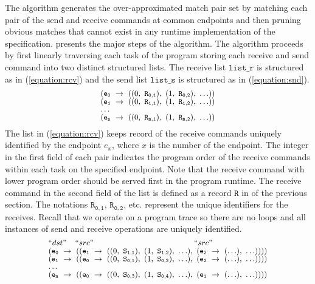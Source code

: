 The algorithm generates the over-approximated match pair set by matching each pair of the send and receive commands at common endpoints and then pruning obvious matches that cannot exist in any runtime implementation of the specification.  presents the major steps of the algorithm. The algorithm proceeds by first linearly traversing each task of the program storing each receive and send command into two distinct structured lists. The receive list $\mathtt{list\_r}$ is structured as in (\ref{equation:rcv}) and the send list $\mathtt{list\_s}$ is structured as in (\ref{equation:snd}).
\begin{equation}
\footnotesize \begin{array}{l}
(\mathtt{e_0}\ \rightarrow\ ((0,\ \mathtt{R_{0,1}}),\ (1,\ \mathtt{R_{0,2}}),\ \ldots))\\
(\mathtt{e_1}\ \rightarrow\ ((0,\ \mathtt{R_{1,1}}),\ (1,\ \mathtt{R_{1,2}}),\ \ldots))\\
\ldots \\
(\mathtt{e_n}\ \rightarrow\ ((0,\ \mathtt{R_{n,1}}),\ (1,\ \mathtt{R_{n,2}}),\ \ldots))\\
\end{array}
\label{equation:rcv}
\end{equation}
The list in (\ref{equation:rcv}) keeps record of the receive commands uniquely identified by the endpoint $\mathit{e}_x$, where $x$ is the number of the endpoint. The integer in the first field of each pair indicates the program order of the receive commands within each task on the specified endpoint. Note that the receive command with lower program order should be served first in the program runtime. The receive command in the second field of the list is defined as a record $\mathtt{R}$ in  of the previous section. The notations $\mathtt{R_{0,1}}$, $\mathtt{R_{0,2}}$, etc. represent the unique identifiers for the receives. Recall that we operate on a program trace so there are no loops and all instances of send and receive operations are uniquely identified.
\begin{equation}
\footnotesize \begin{array}{l}
 ``dst" \;\;\;\; ``src" \;\;\;\;\;\;\;\;\;\;\;\;\;\;\;\;\;\;\;\;\;\;\;\;\;\;\;\;\;\;\;\;\;\;\;\;\;\;\;\;\;\;\;\;\;\; ``src"\\
(\mathtt{e_0}\ \rightarrow\ ((\mathtt{e_1}\ \rightarrow\ ((0,\ \mathtt{S_{1,1}}),\ (1,\ \mathtt{S_{1,2}}),\ \ldots),\ (\mathtt{e_2}\ \rightarrow\ (\ldots),\ \ldots))))\\
(\mathtt{e_1}\ \rightarrow\ ((\mathtt{e_0}\ \rightarrow\ ((0,\ \mathtt{S_{0,1}}),\ (1,\ \mathtt{S_{0,2}}),\ \ldots),\ (\mathtt{e_2}\ \rightarrow\ (\ldots),\ \ldots))))\\
 \dots\\
(\mathtt{e_n}\ \rightarrow\ ((\mathtt{e_0}\ \rightarrow\ ((0,\ \mathtt{S_{0,3}}),\ (1,\ \mathtt{S_{0,4}}),\ \ldots),\ (\mathtt{e_1}\ \rightarrow\ (\ldots),\ \ldots))))\\
\end{array}
\label{equation:snd}
\end{equation}

